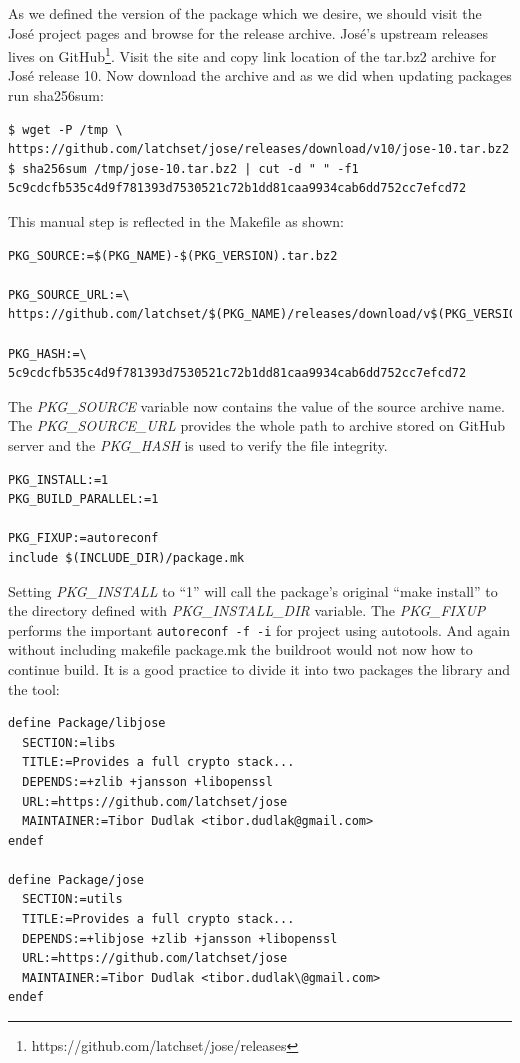 As we defined the version of the package which we desire, we should visit the José project pages and browse for the release archive.
José's upstream releases lives on GitHub\footnote{https://github.com/latchset/jose/releases}.
Visit the site and copy link location of the tar.bz2 archive for José release 10.
Now download the archive and as we did when updating packages run sha256sum:
\begin{lstlisting}[columns=fixed,basicstyle=\ttfamily\footnotesize,tabsize=4,backgroundcolor=\color{yellow!10}]
$ wget -P /tmp \
https://github.com/latchset/jose/releases/download/v10/jose-10.tar.bz2
$ sha256sum /tmp/jose-10.tar.bz2 | cut -d " " -f1
5c9cdcfb535c4d9f781393d7530521c72b1dd81caa9934cab6dd752cc7efcd72
\end{lstlisting}
This manual step is reflected in the Makefile as shown:
\begin{lstlisting}[columns=fixed,basicstyle=\ttfamily\footnotesize,tabsize=4,backgroundcolor=\color{yellow!10}]
PKG_SOURCE:=$(PKG_NAME)-$(PKG_VERSION).tar.bz2

PKG_SOURCE_URL:=\
https://github.com/latchset/$(PKG_NAME)/releases/download/v$(PKG_VERSION)/

PKG_HASH:=\
5c9cdcfb535c4d9f781393d7530521c72b1dd81caa9934cab6dd752cc7efcd72
\end{lstlisting}
The {\it PKG\_SOURCE} variable now contains the value of the source archive name.
The {\it PKG\_SOURCE\_URL} provides the whole path to archive stored on GitHub server and the {\it PKG\_HASH} is used to verify the file integrity.
\begin{lstlisting}[columns=fixed,basicstyle=\ttfamily\footnotesize,tabsize=4,backgroundcolor=\color{yellow!10}]
PKG_INSTALL:=1
PKG_BUILD_PARALLEL:=1

PKG_FIXUP:=autoreconf
include $(INCLUDE_DIR)/package.mk
\end{lstlisting}
Setting {\it PKG\_INSTALL} to “1” will call the package's original “make install” to the directory defined with {\it PKG\_INSTALL\_DIR} variable.
The {\it PKG\_FIXUP} performs the important {\tt autoreconf -f -i} for project using autotools.
And again without including makefile package.mk the buildroot would not now how to continue build.
It is a good practice to divide it into two packages the library and the tool:
\begin{lstlisting}[columns=fixed,basicstyle=\ttfamily\footnotesize,tabsize=4,backgroundcolor=\color{yellow!10}]
define Package/libjose
  SECTION:=libs
  TITLE:=Provides a full crypto stack...
  DEPENDS:=+zlib +jansson +libopenssl
  URL:=https://github.com/latchset/jose
  MAINTAINER:=Tibor Dudlak <tibor.dudlak@gmail.com>
endef

define Package/jose
  SECTION:=utils
  TITLE:=Provides a full crypto stack...
  DEPENDS:=+libjose +zlib +jansson +libopenssl
  URL:=https://github.com/latchset/jose
  MAINTAINER:=Tibor Dudlak <tibor.dudlak\@gmail.com>
endef
\end{lstlisting}
